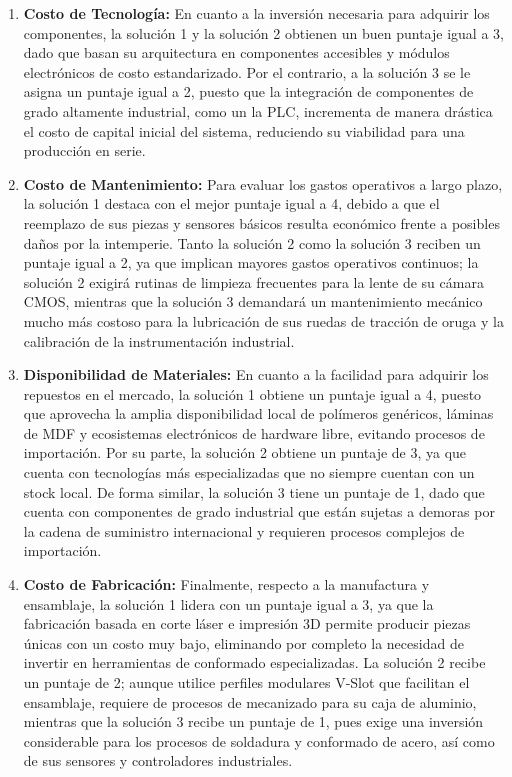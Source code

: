\documentclass[../../General.tex]{subfiles}
\begin{document}
\begin{enumerate}
	\item \textbf{Costo de Tecnología:} En cuanto a la inversión necesaria para adquirir los componentes, la solución 1 y la solución 2 obtienen un buen puntaje igual a 3, dado que basan su arquitectura en componentes accesibles y módulos electrónicos de costo estandarizado. Por el contrario, a la solución 3 se le asigna un puntaje igual a 2, puesto que la integración de componentes de grado altamente industrial, como un la PLC, incrementa de manera drástica el costo de capital inicial del sistema, reduciendo su viabilidad para una producción en serie.
	
	\item \textbf{Costo de Mantenimiento:} Para evaluar los gastos operativos a largo plazo, la solución 1 destaca con el mejor puntaje igual a 4, debido a que el reemplazo de sus piezas y sensores básicos resulta económico frente a posibles daños por la intemperie. Tanto la solución 2 como la solución 3 reciben un puntaje igual a 2, ya que implican mayores gastos operativos continuos; la solución 2 exigirá rutinas de limpieza frecuentes para la lente de su cámara CMOS, mientras que la solución 3 demandará un mantenimiento mecánico mucho más costoso para la lubricación de sus ruedas de tracción de oruga y la calibración de la instrumentación industrial.
	
	\item \textbf{Disponibilidad de Materiales:} En cuanto a la facilidad para adquirir los repuestos en el mercado, la solución 1 obtiene un puntaje igual a 4, puesto que aprovecha la amplia disponibilidad local de polímeros genéricos, láminas de MDF y ecosistemas electrónicos de hardware libre, evitando procesos de importación. Por su parte, la solución 2 obtiene un puntaje de 3, ya que cuenta con tecnologías más especializadas que no siempre cuentan con un stock local. De forma similar, la solución 3 tiene un puntaje de 1, dado que cuenta con componentes de grado industrial que están sujetas a demoras por la cadena de suministro internacional y requieren procesos complejos de importación.
	
	\item \textbf{Costo de Fabricación:} Finalmente, respecto a la manufactura y ensamblaje, la solución 1 lidera con un puntaje igual a 3, ya que la fabricación basada en corte láser e impresión 3D permite producir piezas únicas con un costo muy bajo, eliminando por completo la necesidad de invertir en herramientas de conformado especializadas. La solución 2 recibe un puntaje de 2; aunque utilice perfiles modulares V-Slot que facilitan el ensamblaje, requiere de procesos de mecanizado para su caja de aluminio, mientras que la solución 3 recibe un puntaje de 1, pues exige una inversión considerable  para los procesos de soldadura y conformado de acero, así como de sus sensores y controladores industriales.
\end{enumerate}
\end{document}
